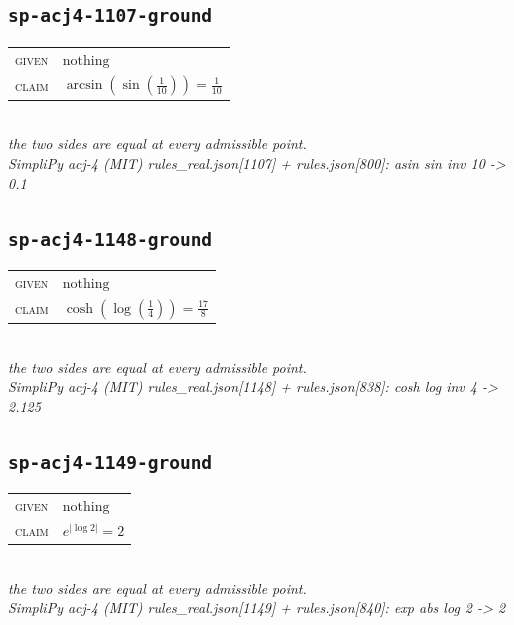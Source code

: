 \documentclass[11pt]{article}
\begin{document}
\subsection*{\texttt{sp-acj4-1107-ground}}
\begin{tabular}{@{}l@{\quad}l@{}}
\textsc{given} & $\text{nothing}$ \\[4pt]
\textsc{claim} & $\displaystyle \arcsin\left(\sin\left(\frac{1}{10}\right)\right) = \frac{1}{10}$ \\
\end{tabular}\\[2pt]
{\small\emph{the two sides are equal at every admissible point.}}\\
\emph{SimpliPy acj-4 (MIT) rules\_real.json[1107] + rules.json[800]: asin sin inv 10  ->  0.1}\\

\subsection*{\texttt{sp-acj4-1148-ground}}
\begin{tabular}{@{}l@{\quad}l@{}}
\textsc{given} & $\text{nothing}$ \\[4pt]
\textsc{claim} & $\displaystyle \cosh\left(\log\left(\frac{1}{4}\right)\right) = \frac{17}{8}$ \\
\end{tabular}\\[2pt]
{\small\emph{the two sides are equal at every admissible point.}}\\
\emph{SimpliPy acj-4 (MIT) rules\_real.json[1148] + rules.json[838]: cosh log inv 4  ->  2.125}\\

\subsection*{\texttt{sp-acj4-1149-ground}}
\begin{tabular}{@{}l@{\quad}l@{}}
\textsc{given} & $\text{nothing}$ \\[4pt]
\textsc{claim} & $\displaystyle e^{\left|\log 2\right|} = 2$ \\
\end{tabular}\\[2pt]
{\small\emph{the two sides are equal at every admissible point.}}\\
\emph{SimpliPy acj-4 (MIT) rules\_real.json[1149] + rules.json[840]: exp abs log 2  ->  2}\\
\end{document}
